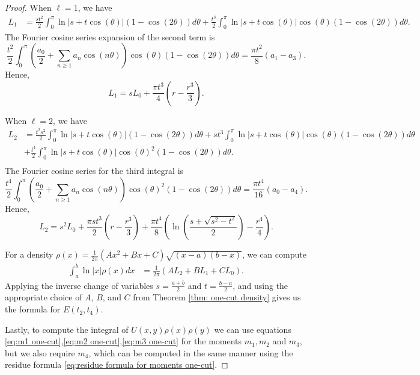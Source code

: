 \documentclass[10pt,a4paper]{amsart}
\begin{document}
\begin{proof}
When $\ell =1$, we have 
\begin{align*}
 L_{1} &=\frac{st^2}{2}\int_{0}^{\pi} \ln|s+t\cos (\theta)| \left(1-\cos(2 \theta)\right) d \theta
 + \frac{t^3}{2}\int_{0}^{\pi} \ln|s+t\cos (\theta)| \cos (\theta)\left(1-\cos(2 \theta)\right) d \theta.
\end{align*}
The Fourier cosine series expansion of the second term is 
$$
 \frac{t^2}{2}\int_0^\pi\left(\frac{a_0}{2}+\sum_{n \geq 1} a_n \cos ( n \theta)\right)\cos(\theta)\left(1-\cos (2\theta)\right) d \theta= \frac{\pi t^2 }{8}(a_{1} -a_{3}).
$$
Hence, 
\begin{equation*}
 L_{1} = s L_{0} + \frac{\pi t^{3}}{4}\left(r - \frac{r^3}{3} \right).
\end{equation*}

When $\ell =2$, we have 
\begin{align*}
 L_{2} &=\frac{t^2s^2}{2}\int_{0}^{\pi} \ln|s+t\cos (\theta)| \left(1-\cos(2 \theta)\right) d \theta +st^3\int_{0}^{\pi} \ln|s+t\cos (\theta)|\cos(\theta) \left(1-\cos(2 \theta)\right) d \theta\\
 &+\frac{t^4}{2}\int_{0}^{\pi} \ln|s+t\cos (\theta)| \cos(\theta)^2\left(1-\cos(2 \theta)\right) d \theta.\\
\end{align*}
The Fourier cosine series for the third integral is 
\begin{equation*}
 \frac{t^{4}}{2}\int_0^\pi\left(\frac{a_0}{2}+\sum_{n \geq 1} a_n \cos (n \theta)\right)\cos(\theta)^2\left(1-\cos (2 \theta)\right) d \theta= \frac{\pi t^{4}}{16}(a_{0}-a_{4}).
\end{equation*}
Hence, 
\begin{equation*}
 L_{2} = s^2 L_{0} + \frac{\pi s t^3}{2}\left( r - \frac{r^3}{3}\right) + \frac{\pi t^{4}}{8}\left(\ln \left(\frac{s+\sqrt{s^2-t^2}}{2}\right) - \frac{r^{4}}{4}\right).
\end{equation*}



For a density 
$\rho(x) = \frac{1}{2\pi}(Ax^2 + Bx + C)\sqrt{(x-a)(b-x)}$, we can compute 
\begin{align*}
 \int_{a}^{b} \ln|x| \rho(x) dx &= \frac{1}{2 \pi}( AL_{2} + B L_{1} + CL_{0}).
\end{align*}
Applying the inverse change of variables $s =\frac{a+b}{2}$ and $t =\frac{b-a}{2}$, and using the appropriate choice of $A$, $B$, and $C$ from Theorem \ref{thm: one-cut density} gives us the formula for $E(t_{2},t_{4})$.



Lastly, to compute the integral of $U(x,y)\rho(x)\rho(y)$ we can use equations \eqref{eq:m1 one-cut},\eqref{eq:m2 one-cut},\eqref{eq:m3 one-cut} for the moments $m_{1},m_{2}$ and $m_{3}$, but we also require $m_{4}$, which can be computed in the same manner using the residue formula \eqref{eq:residue formula for moments one-cut}.
\end{proof}
\end{document}
